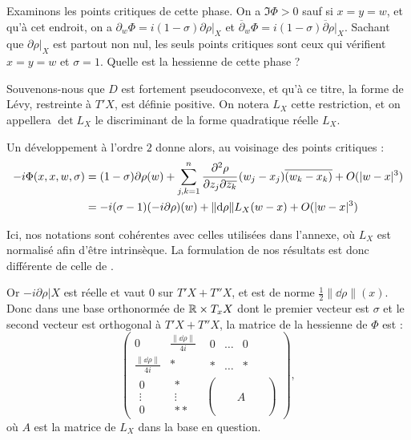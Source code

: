 Examinons les points critiques de cette phase. On a $\Im \Phi >0$ sauf si $x=y=w$, et qu'à cet endroit, on a $\partial_w\Phi = i(1-\sigma)\partial \rho|_X$ et $\overline{\partial}_w\Phi=i(1-\sigma)\overline{\partial}\rho|_X$. Sachant que $\partial \rho|_X$ est partout non nul, les seuls points critiques sont ceux qui vérifient $x=y=w$ et $\sigma =1$.
Quelle est la hessienne de cette phase ? 

Souvenons-nous que $D$ est fortement pseudoconvexe, et qu'à ce titre, la forme de Lévy, restreinte à $T'X$, est définie positive. On notera $L_X$ cette restriction, et on appellera $\det L_X$ le discriminant de la forme quadratique réelle $L_X$. 

Un développement à l'ordre $2$ donne alors, au voisinage des points critiques :
\begin{align*}
  -i\Phi(x,x,w,\sigma)&=(1-\sigma) \partial\rho(w) + \sum_{j,k=1}^n\cfrac{\partial^2\rho}{\partial z_j\partial \overline{z_k}}\,(w_j-x_j)\overline{(w_k-x_k)} + O(|w-x|^3)\\
  &= -i(\sigma-1) (-i\partial\rho)(w) + \|\mathrm{d}\rho\|L_{X}(w-x) + O(|w-x|^3)
\end{align*}

\begin{rem}
Ici, nos notations sont cohérentes avec celles utilisées dans l'annexe, où $L_X$ est normalisé afin d'être intrinsèque. La formulation de nos résultats est donc différente de celle de \cite{BoutetdeMonvel1975}.
\end{rem}

Or $-i\partial \rho|X$ est réelle et vaut $0$ sur $T'X+T''X$, et est de norme $\frac 12 \|\dd\rho\|(x)$. Donc dans une base orthonormée de $\mathbb{R}\times T_xX$ dont le premier vecteur est $\sigma$ et le second vecteur est orthogonal à $T'X+T''X$, la matrice de la hessienne de $\Phi$ est :
\begin{equation*}
\begin{pmatrix}
  0 & \frac{\|\dd\rho\|}{4i} &\begin{matrix}0&\ldots & 0\end{matrix}\\
  \frac{\|\dd\rho\|}{4i} & * & \begin{matrix}*&\ldots & *\end{matrix}\\
  \begin{matrix}0\\\vdots\\0\end{matrix}& \begin{matrix}*\\\vdots\\** \end{matrix}&\begin{pmatrix}\phantom{A}&\phantom{A}&\phantom{A}\\\phantom{A}&A&\phantom{A}\\\phantom{A}&\phantom{A}&\phantom{A}\end{pmatrix}
\end{pmatrix},
\end{equation*}
où $A$ est la matrice de $L_X$ dans la base en question. 

